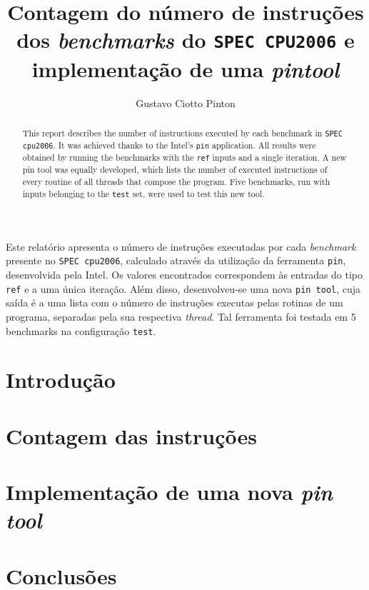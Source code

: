 \documentclass[12pt]{article}
\title{Contagem do número de instruções dos \textit{benchmarks} do
\texttt{SPEC CPU2006} e implementação de uma \textit{pintool}}
\author{Gustavo Ciotto Pinton\inst{1} }
\begin{document}
 

\maketitle

\begin{abstract}
This report describes the number of instructions executed by each
benchmark in \texttt{SPEC cpu2006}. It was achieved thanks to the
Intel's \texttt{pin} application. All results were obtained by running the
benchmarks with the \texttt{ref} inputs and a single iteration. A new
pin tool was equally developed, which lists the number of executed instructions
of every routine of all threads that compose the program. Five benchmarks,
run with inputs belonging to the \texttt{test} set, were used to test this new
tool.
\end{abstract}
     
\begin{resumo} 
Este relatório apresenta o número de instruções executadas por cada
\textit{benchmark} presente no \texttt{SPEC cpu2006}, calculado através da
utilização da ferramenta \texttt{pin}, desenvolvida pela Intel. Os valores
encontrados correspondem às entradas do tipo \texttt{ref} e a uma única
iteração. Além disso, desenvolveu-se uma nova \texttt{pin tool}, cuja saída
é a uma lista com o número de instruções executas pelas rotinas de um programa,
separadas pela sua respectiva \textit{thread}. Tal ferramenta foi testada em 5
benchmarks na configuração \texttt{test}.
\end{resumo}


\section{Introdução}


\section{Contagem das instruções} \label{sec:count}


\section{Implementação de uma nova \textit{pin tool}} \label{sec:tool}


\section{Conclusões}




\end{document}
